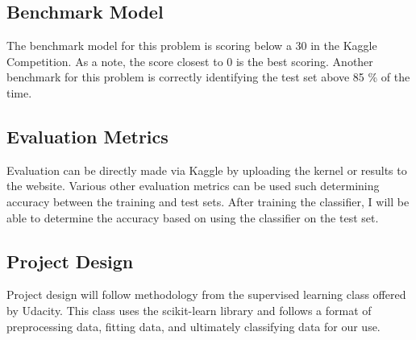 \documentclass{article}
\begin{document}
\subsection{Benchmark Model}
The benchmark model for this problem is scoring below a 30 in the Kaggle Competition. As a note, the score closest to 0 is the best scoring. Another benchmark for this problem is correctly identifying the test set above 85 \% of the time. 

\subsection{Evaluation Metrics}
Evaluation can be directly made via Kaggle by uploading the kernel or results to the website. Various other evaluation metrics can be used such determining accuracy between the training and test sets. After training the classifier, I will be able to determine the accuracy based on using the classifier on the test set.

\subsection{Project Design}
Project design will follow methodology from the supervised learning class offered by Udacity. This class uses the scikit-learn library and follows a format of preprocessing data, fitting data, and ultimately classifying data for our use.
\end{document}
